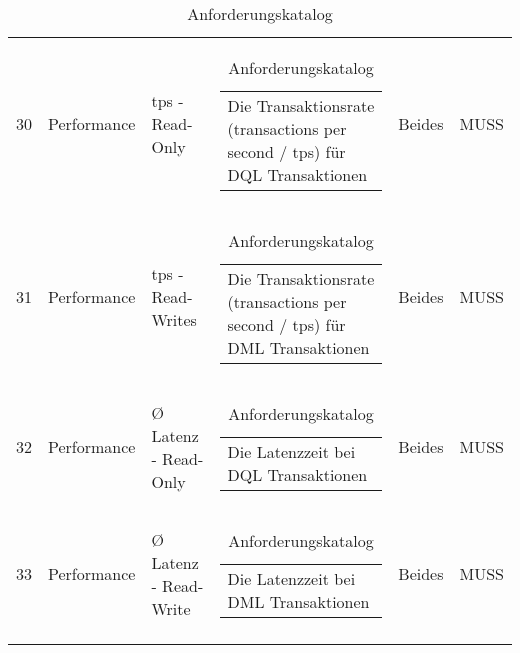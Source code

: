 {\begin{longtable}[H]{rlllll}
30 & Performance & tps - Read-Only & \begin{tabular}[c]{@{}l@{}}Die Transaktionsrate (transactions per second / tps) für DQL Transaktionen\end{tabular} & Beides & MUSS \\
31 & Performance & tps - Read-Writes & \begin{tabular}[c]{@{}l@{}}Die Transaktionsrate (transactions per second / tps) für DML Transaktionen\end{tabular} & Beides & MUSS \\
32 & Performance & Ø Latenz - Read-Only & \begin{tabular}[c]{@{}l@{}}Die Latenzzeit bei DQL Transaktionen\end{tabular} & Beides & MUSS \\
33 & Performance & Ø Latenz - Read-Write & \begin{tabular}[c]{@{}l@{}}Die Latenzzeit bei DML Transaktionen\end{tabular} & Beides & MUSS \\
\caption{Anforderungskatalog} \label{anforderungskatalog}
\end{longtable}

}
